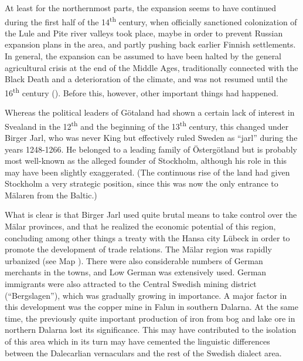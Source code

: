 \begin{styleBodytextC}
At least for the northernmost parts, the expansion seems to have continued during the first half of the 14\textsuperscript{th} century, when officially sanctioned colonization of the Lule and Pite river valleys took place, maybe in order to prevent Russian expansion plans in the area, and partly pushing back earlier Finnish settlements. In general, the expansion can be assumed to have been halted by the general agricultural crisis at the end of the Middle Ages, traditionally connected with the Black Death and a deterioration of the climate, and was not resumed until the 16\textsuperscript{th} century (\citet[248]{Myrdal2003}). Before this, however, other important things had happened.

\end{styleBodytextC}

\begin{styleBodytextC}
Whereas the political leaders of Götaland had shown a certain lack of interest in Svealand in the 12\textsuperscript{th} and the beginning of the 13\textsuperscript{th} century, this changed under Birger Jarl, who was never King but effectively ruled Sweden as “jarl” during the years 1248-1266. He belonged to a leading family of Östergötland but is probably most well-known as the alleged founder of Stockholm, although his role in this may have been slightly exaggerated. (The continuous rise of the land had given Stockholm a very strategic position, since this was now the only entrance to Mälaren from the Baltic.)

\end{styleBodytextC}

\begin{styleBodytextC}
What is clear is that Birger Jarl used quite brutal means to take control over the Mälar provinces, and that he realized the economic potential of this region, concluding among other things a treaty with the Hansa city Lübeck in order to promote the development of trade relations. The Mälar region was rapidly urbanized (see Map ). There were also considerable numbers of German merchants in the towns, and Low German was extensively used. German immigrants were also attracted to the Central Swedish mining district (“Bergslagen”), which was gradually growing in importance. A major factor in this development was the copper mine in Falun in southern Dalarna. At the same time, the previously quite important production of iron from bog and lake ore in northern Dalarna lost its significance. This may have contributed to the isolation of this area which in its turn may have cemented the linguistic differences between the Dalecarlian vernaculars and the rest of the Swedish dialect area. 

\end{styleBodytextC}

